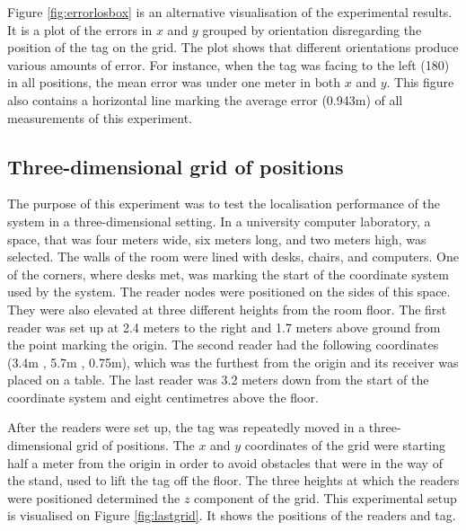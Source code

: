 Figure \ref{fig:errorlosbox} is an alternative visualisation of the experimental results. It is a plot of the errors in $x$ and $y$ grouped by orientation disregarding the position of the tag on the grid. The plot shows that different orientations produce various amounts of error. For instance, when the tag was facing to the left (180\textdegree) in all positions, the mean error was under one meter in both $x$ and $y$. This figure also contains a horizontal line marking the average error (0.943m) of all measurements of this experiment.


\subsection{Three-dimensional grid of positions}
\label{sec:3d}

The purpose of this experiment was to test the localisation performance of the system in a three-dimensional setting. In a university computer laboratory, a space, that was four meters wide, six meters long, and two meters high, was selected. The walls of the room were lined with desks, chairs, and computers. One of the corners, where desks met, was marking the start of the coordinate system used by the system. The reader nodes were positioned on the sides of this space. They were also elevated at three different heights from the room floor. The first reader was set up at 2.4 meters to the right and 1.7 meters above ground from the point marking the origin. The second reader had the following coordinates (3.4m , 5.7m , 0.75m), which was the furthest from the origin and its receiver was placed on a table. The last reader was 3.2 meters down from the start of the coordinate system and eight centimetres above the floor.

After the readers were set up, the tag was repeatedly moved in a three-dimensional grid of positions. The $x$ and $y$ coordinates of the grid were starting half a meter from the origin in order to avoid obstacles that were in the way of the stand, used to lift the tag off the floor. The three heights at which the readers were positioned determined the $z$ component of the grid. This experimental setup is visualised on Figure \ref{fig:lastgrid}. It shows the positions of the readers and tag.

